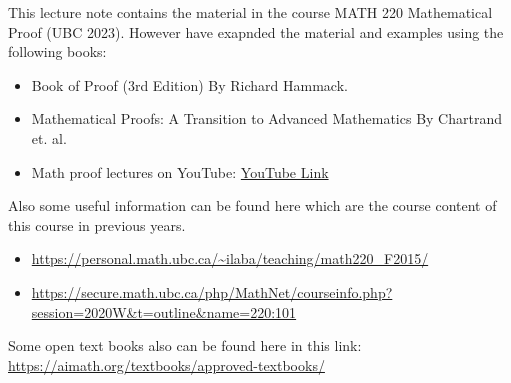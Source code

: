 \documentclass[10pt]{article}
\begin{document}

This lecture note contains the material in the course MATH 220 Mathematical Proof (UBC 2023). However have exapnded the material and examples using the following books:

\begin{itemize}
	\item Book of Proof (3rd Edition) By Richard Hammack.
	\item Mathematical Proofs: A Transition to Advanced Mathematics By Chartrand et. al.
	\item Math proof lectures on YouTube: \href{https://www.youtube.com/watch?v=UuETUEJo0rk&list=PL2419488168AE7001&index=1}{YouTube Link} 
\end{itemize}



Also some useful information can be found here which are the course content of this course in previous years.
\begin{itemize}
	\item \url{https://personal.math.ubc.ca/~ilaba/teaching/math220_F2015/}
	\item \url{https://secure.math.ubc.ca/php/MathNet/courseinfo.php?session=2020W&t=outline&name=220:101}
\end{itemize}


Some open text books also can be found here in this link: \url{https://aimath.org/textbooks/approved-textbooks/}

\newpage

\newpage

\end{document}
